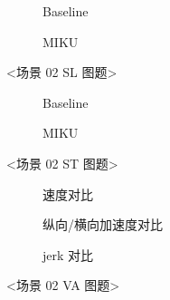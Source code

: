 \begin{figure}[H]
\centering
\begin{subfigure}[b]{\textwidth}
  \centering
  
  \caption{Baseline}
  \label{fig:exp_02_ped_plus_parked_sl:a}
\end{subfigure}

\begin{subfigure}[b]{\textwidth}
  \centering
  
  \caption{MIKU}
  \label{fig:exp_02_ped_plus_parked_sl:b}
\end{subfigure}
\caption{<场景 02 SL 图题>}
\label{fig:exp_02_ped_plus_parked_sl}
\end{figure}

\begin{figure}[H]
\centering
\begin{subfigure}[b]{0.48\textwidth}
  \centering
  
  \caption{Baseline}
  \label{fig:exp_02_ped_plus_parked_st:a}
\end{subfigure}\hfill
\begin{subfigure}[b]{0.48\textwidth}
  \centering
  
  \caption{MIKU}
  \label{fig:exp_02_ped_plus_parked_st:b}
\end{subfigure}
\caption{<场景 02 ST 图题>}
\label{fig:exp_02_ped_plus_parked_st}
\end{figure}

\begin{figure}[H]
\centering
\begin{subfigure}[b]{\textwidth}
  \centering
  
  \caption{速度对比}
  \label{fig:exp_02_ped_plus_parked_va:a}
\end{subfigure}

\begin{subfigure}[b]{\textwidth}
  \centering
  
  \caption{纵向/横向加速度对比}
  \label{fig:exp_02_ped_plus_parked_va:b}
\end{subfigure}

\begin{subfigure}[b]{\textwidth}
  \centering
  
  \caption{jerk 对比}
  \label{fig:exp_02_ped_plus_parked_va:c}
\end{subfigure}
\caption{<场景 02 VA 图题>}
\label{fig:exp_02_ped_plus_parked_va}
\end{figure}


